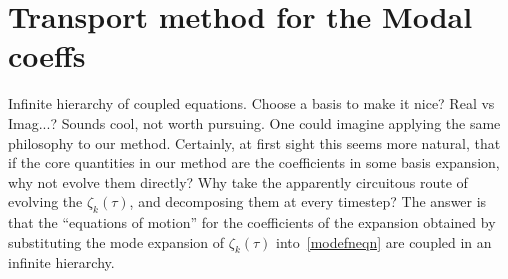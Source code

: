 \documentclass[withindex,glossary]{cam-thesis}
\begin{document}
\section{Transport method for the Modal coeffs}\label{appendix_modal_transport}
Infinite hierarchy of coupled equations.
Choose a basis to make it nice?
Real vs Imag...?
Sounds cool, not worth pursuing.
One could imagine applying the same philosophy to our method.
Certainly, at first sight this seems more natural, that if the core
quantities in our method are the coefficients in some basis expansion,
why not evolve them directly? Why take the apparently circuitous route
of evolving the $\zeta_k(\tau)$, and decomposing them at every timestep?
The answer is that the ``equations of motion'' for the coefficients of the expansion
obtained by substituting the mode expansion of $\zeta_k(\tau)$ into~\eqref{modefneqn}
are coupled in an infinite hierarchy.



\printthesisindex
\end{document}
